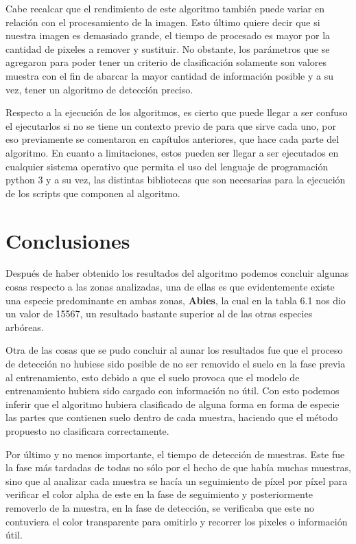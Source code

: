 Cabe recalcar que el rendimiento de este algoritmo también puede variar en relación con el procesamiento de la imagen. Esto último quiere decir que si nuestra imagen es demasiado grande, el tiempo de procesado es mayor por la cantidad de pixeles a remover y sustituir. 
No obstante, los parámetros que se agregaron para poder tener un criterio de clasificación solamente son valores muestra con el fin de abarcar la mayor cantidad de información posible y a su vez, tener un algoritmo de detección preciso.

Respecto a la ejecución de los algoritmos, es cierto que puede llegar a ser confuso el ejecutarlos si no se tiene un contexto previo de para que sirve cada uno, por eso previamente se comentaron en capítulos anteriores, que hace cada parte del algoritmo. En cuanto a limitaciones, estos pueden ser llegar a ser ejecutados en cualquier sistema operativo que permita el uso del lenguaje de programación python 3 y a su vez, las distintas bibliotecas que son necesarias para la ejecución de los scripts que componen al algoritmo.


\chapter{Conclusiones}
Después de haber obtenido los resultados del algoritmo podemos concluir algunas cosas respecto a las zonas analizadas, una de ellas es que evidentemente existe una especie predominante en ambas zonas, \textbf{Abies}, la cual en la tabla 6.1 nos dio un valor de 15567, un resultado bastante superior al de las otras especies arbóreas.

Otra de las cosas que se pudo concluir al aunar los resultados fue que el proceso de detección no hubiese sido posible de no ser removido el suelo en la fase previa al entrenamiento, esto debido a que el suelo provoca que el modelo de entrenamiento hubiera sido cargado con información no útil. Con esto podemos inferir que el algoritmo hubiera clasificado de alguna forma en forma de especie las partes que contienen suelo dentro de cada muestra, haciendo que el método propuesto no clasificara correctamente.

Por último y no menos importante, el tiempo de detección de muestras. Este fue la fase más tardadas de todas no sólo por el hecho de que había muchas muestras, sino que al analizar cada muestra se hacía un seguimiento de píxel por píxel para verificar el color alpha de este en la fase de seguimiento y posteriormente removerlo de la muestra, en la fase de detección, se verificaba que este no contuviera el color transparente para omitirlo y recorrer los pixeles o información útil.
